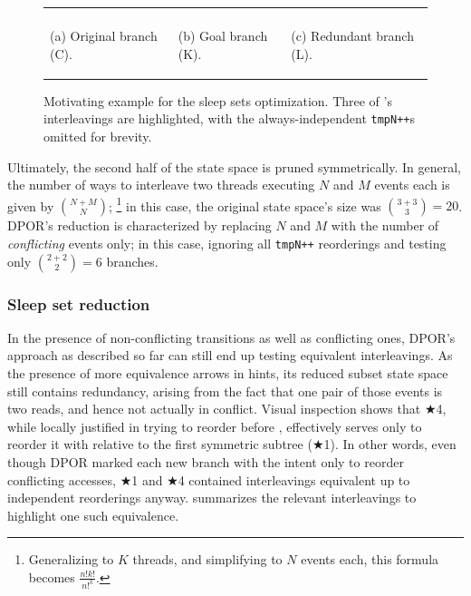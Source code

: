 \begin{figure}[ht!]
\begin{center}
\begin{tabular}{p{}p{}p{}}
\begin{center}
	\end{center}
	\\
	\begin{center}
	(a) Original branch (C).
	\end{center}
	&
	\begin{center}
	(b) Goal branch (K).
	\end{center}
	&
	\begin{center}
	(c) Redundant branch (L).
	\end{center}
	\end{tabular}
	\end{center}
	\caption[Motivating example for the sleep sets optimization.]
		{Motivating example for the sleep sets optimization.
	Three of 's interleavings are highlighted,
	with the always-independent {\tt tmpN++}s omitted for brevity.
	}
	\label{fig:sleepsets}
\end{figure}

Ultimately, the second half of the state space is pruned symmetrically.
In general, the number of ways to interleave two threads executing $N$ and $M$ events each is given by ${N+M \choose N}$;%
\footnote{Generalizing to $K$ threads, and simplifying to $N$ events each,
this formula becomes $\frac{n!k!}{n!^k}$.}
in this case, the original state space's size was ${3+3 \choose 3} = 20$.
DPOR's reduction is characterized by replacing $N$ and $M$ with the number of {\em conflicting} events only;
in this case, ignoring all {\tt tmpN++} reorderings and testing only ${2+2 \choose 2} = 6$ branches.

\subsubsection{Sleep set reduction}
\label{sec:landslide-sleepsets}

In the presence of non-conflicting transitions as well as conflicting ones,
DPOR's approach as described so far can still end up testing equivalent interleavings.
As the presence of more equivalence arrows in  hints,
its reduced subset state space still contains redundancy,
arising from the fact that one pair of those  events is two reads, and hence not actually in conflict.
Visual inspection shows that $\bigstar$4, while locally justified
in trying to reorder  before ,
effectively serves %
only to reorder it with 
relative to the first symmetric subtree ($\bigstar$1).
In other words,
even though DPOR marked each new branch with the intent only to reorder conflicting accesses,
$\bigstar$1 and $\bigstar$4 contained interleavings equivalent up to independent reorderings anyway.
 summarizes the relevant interleavings to highlight one such equivalence.

